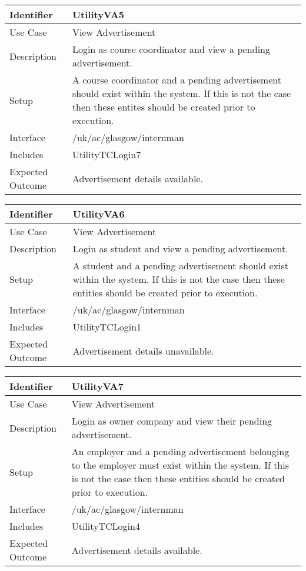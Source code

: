 \vspace{2em}

\begin{tabularx}{\textwidth}{|T|L|}
\hline
Identifier & UtilityVA5\\
\hline
Use Case & View Advertisement \\
\hline
Description & Login as course coordinator and view a pending advertisement.\\
\hline
Setup & A course coordinator and a pending advertisement should exist
within the system. If this is not the case then these entites should
be created prior to execution.\\
\hline
Interface & /uk/ac/glasgow/internman \\
\hline
Includes & UtilityTCLogin7\\
\hline
Expected Outcome & Advertisement details available.\\
\hline
\end{tabularx}

\vspace{2em}

\begin{tabularx}{\textwidth}{|T|L|}
\hline
Identifier & UtilityVA6\\
\hline
Use Case & View Advertisement \\
\hline
Description & Login as student and view a pending advertisement.\\
\hline
Setup & A student and a pending advertisement should exist within the
system. If this is not the case then these entities should be created
prior to execution. \\
\hline
Interface & /uk/ac/glasgow/internman \\
\hline
Includes & UtilityTCLogin1 \\
\hline
Expected Outcome & Advertisement details unavailable.\\
\hline
\end{tabularx}

\vspace{2em}

\begin{tabularx}{\textwidth}{|T|L|}
\hline
Identifier & UtilityVA7\\
\hline
Use Case & View Advertisement \\
\hline
Description & Login as owner company and view their pending advertisement.\\
\hline
Setup & An employer and a pending advertisement belonging to the
employer must exist within the system. If this is not the case then
these entities should be created prior to execution.\\
\hline
Interface & /uk/ac/glasgow/internman \\
\hline
Includes & UtilityTCLogin4\\
\hline
Expected Outcome & Advertisement details available.\\
\hline
\end{tabularx}


